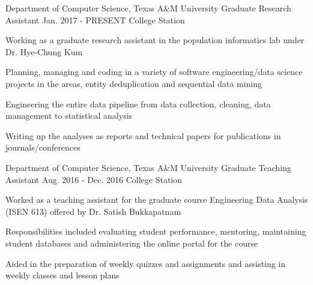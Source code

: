 

\begin{cventries}

  \cventry
    {Department of Computer Science, Texas A\&M University} %
    {Graduate Research Assistant} %
    {Jan. 2017 - PRESENT} %
     {College Station} %
    {
      \begin{cvitems} %
        \item {Working as a graduate research assistant in the population informatics lab under Dr. Hye-Chung Kum}
        \item {Planning, managing and coding in a variety of software engineering/data science projects in the areas, entity deduplication and sequential data mining}
        \item {Engineering the entire data pipeline from data collection, cleaning, data management to statistical analysis}
        \item {Writing up the analyses as reports and technical papers for publications in journals/conferences}
      \end{cvitems}
    }


 \cventry
    {Department of Computer Science, Texas A\&M University} %
    {Graduate Teaching Assistant} %
    {Aug. 2016 - Dec. 2016} %
    {College Station} %
    {
      \begin{cvitems} %
        \item {Worked as a teaching assistant for the graduate course Engineering Data Analysis (ISEN 613) offered by Dr. Satish Bukkapatnam}
        \item {Responsibilities included evaluating student performance, mentoring, maintaining student databases and administering the online portal for the course}
        \item {Aided in the preparation of weekly quizzes and assignments and assisting in weekly classes and lesson plans}
      \end{cvitems}
    }



\end{cventries}
